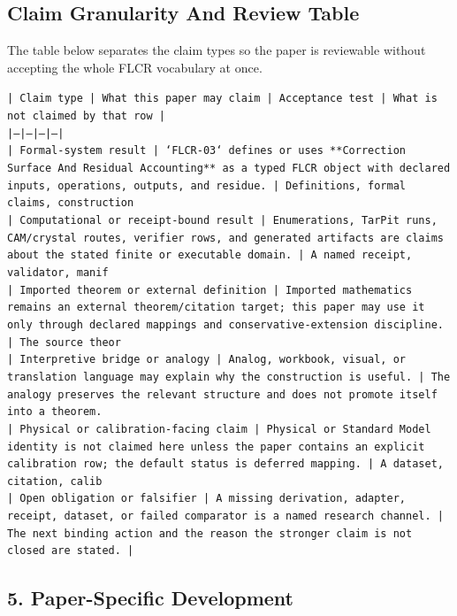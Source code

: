 \documentclass[11pt]{article}
\begin{document}
\subsection*{Claim Granularity And Review Table}

The table below separates the claim types so the paper is reviewable without accepting the whole FLCR vocabulary at once.

\noindent\texttt{| Claim type | What this paper may claim | Acceptance test | What is not claimed by that row |}\\
\noindent\texttt{|---|---|---|---|}\\
\noindent\texttt{| Formal-system result | `FLCR-03` defines or uses **Correction Surface And Residual Accounting** as a typed FLCR object with declared inputs, operations, outputs, and residue. | Definitions, formal claims, construction }\\
\noindent\texttt{| Computational or receipt-bound result | Enumerations, TarPit runs, CAM/crystal routes, verifier rows, and generated artifacts are claims about the stated finite or executable domain. | A named receipt, validator, manif}\\
\noindent\texttt{| Imported theorem or external definition | Imported mathematics remains an external theorem/citation target; this paper may use it only through declared mappings and conservative-extension discipline. | The source theor}\\
\noindent\texttt{| Interpretive bridge or analogy | Analog, workbook, visual, or translation language may explain why the construction is useful. | The analogy preserves the relevant structure and does not promote itself into a theorem. }\\
\noindent\texttt{| Physical or calibration-facing claim | Physical or Standard Model identity is not claimed here unless the paper contains an explicit calibration row; the default status is deferred mapping. | A dataset, citation, calib}\\
\noindent\texttt{| Open obligation or falsifier | A missing derivation, adapter, receipt, dataset, or failed comparator is a named research channel. | The next binding action and the reason the stronger claim is not closed are stated. | }\\

\subsection*{5. Paper-Specific Development}
\end{document}
